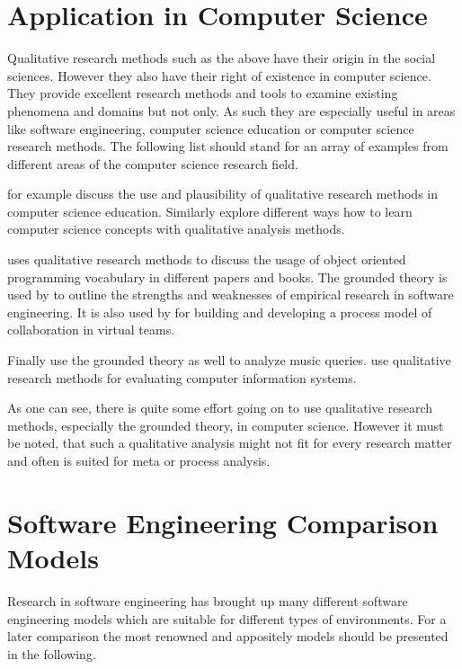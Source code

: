 
\section{Application in Computer Science} %

Qualitative research methods such as the above have their origin in the social
sciences. However they also have their right of existence in computer science.
They provide excellent research methods and tools to examine existing phenomena
and domains but not only. As such they are especially useful in areas like
software engineering, computer science education or computer science research
methods. The following list should stand for an array of examples from
different areas of the computer science research field.

\textcite{Hazzan2006} for example discuss the use and plausibility of
qualitative research methods in computer science education. Similarly
\textcite{Meerbaum-Salant2010} explore different ways how to learn computer
science concepts with qualitative analysis methods.

\textcite{Armstrong2006} uses qualitative research methods to discuss the usage
of object oriented programming vocabulary in different papers and books. The
grounded theory is used by \textcite{Perry2000} to outline the strengths and
weaknesses of empirical research in software engineering. It is also used by
\textcite{Sarker2001} for building and developing a process model of
collaboration in virtual teams.

Finally \textcite{Bainbridge2003} use the grounded theory as well to analyze
music queries. \textcite{Kaplan1994} use qualitative research methods for
evaluating computer information systems.

As one can see, there is quite some effort going on to use qualitative research
methods, especially the grounded theory, in computer science. However it must
be noted, that such a qualitative analysis might not fit for every research
matter and often is suited for meta or process analysis.


\section{Software Engineering Comparison Models} %

Research in software engineering has brought up many different software
engineering models which are suitable for different types of environments. For
a later comparison the most renowned and appositely models should be presented
in the following.

